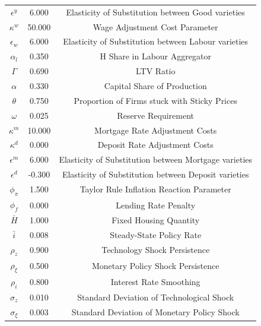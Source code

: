 \begin{center}
\begin{longtable}{ccc}
$\epsilon^y$ 	 & 	 6.000 	 & 	 Elasticity of Substitution between Good varieties\\
$\kappa^w$ 	 & 	 50.000 	 & 	 Wage Adjustment Cost Parameter\\
$\epsilon_w$ 	 & 	 6.000 	 & 	 Elasticity of Substitution between Labour varieties\\
$\alpha_l$ 	 & 	 0.350 	 & 	 H Share in Labour Aggregator\\
$\Gamma$ 	 & 	 0.690 	 & 	 LTV Ratio\\
$\alpha$ 	 & 	 0.330 	 & 	 Capital Share of Production\\
$\theta$ 	 & 	 0.750 	 & 	 Proportion of Firms stuck with Sticky Prices\\
$\omega$ 	 & 	 0.025 	 & 	 Reserve Requirement\\
$\kappa^m$ 	 & 	 10.000 	 & 	 Mortgage Rate Adjustment Costs\\
$\kappa^d$ 	 & 	 0.000 	 & 	 Deposit Rate Adjustment Costs\\
$\epsilon^m$ 	 & 	 6.000 	 & 	 Elasticity of Substitution between Mortgage varieties\\
$\epsilon^d$ 	 & 	 -0.300 	 & 	 Elasticity of Substitution between Deposit varieties\\
$\phi_\pi$ 	 & 	 1.500 	 & 	 Taylor Rule Inflation Reaction Parameter\\
$\phi_f$ 	 & 	 0.000 	 & 	 Lending Rate Penalty\\
$\bar{H}$ 	 & 	 1.000 	 & 	 Fixed Housing Quantity\\
$\bar{i}$ 	 & 	 0.008 	 & 	 Steady-State Policy Rate\\
$\rho_z$ 	 & 	 0.900 	 & 	 Technology Shock Persistence\\
$\rho_\xi$ 	 & 	 0.500 	 & 	 Monetary Policy Shock Persistence\\
$\rho_i$ 	 & 	 0.800 	 & 	 Interest Rate Smoothing\\
$\sigma_z$ 	 & 	 0.010 	 & 	 Standard Deviation of Technological Shock\\
$\sigma_\xi$ 	 & 	 0.003 	 & 	 Standard Deviation of Monetary Policy Shock\\
\bottomrule%
\end{longtable}
\end{center}
